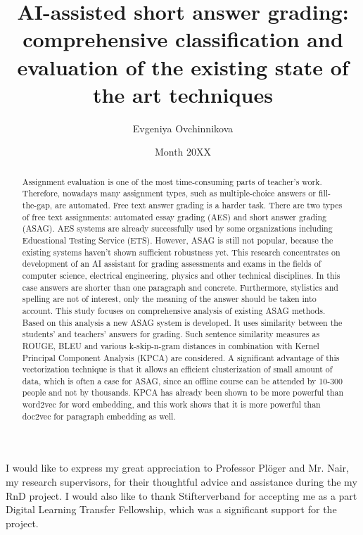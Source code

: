 \documentclass[rnd]{mas_report}
\author{Evgeniya Ovchinnikova}
\title{AI-assisted short answer grading: comprehensive classification and evaluation of the existing state of the art techniques}
\date{Month 20XX}
\begin{document}
\begin{titlepage}
    \maketitle
\end{titlepage}


\pagestyle{plain}


\cleardoublepage
\statementpage

\begin{abstract}
Assignment evaluation is one of the most time-consuming parts of teacher's work. Therefore, nowadays many assignment types, such as multiple-choice answers or fill-the-gap, are automated. Free text answer grading is a harder task. There are two types of free text assignments: automated essay grading (AES) and short answer grading (ASAG). AES systems are already successfully used by some organizations including Educational Testing Service (ETS). However, ASAG is still not popular, because the existing systems haven't shown sufficient robustness yet. This research concentrates on development of an AI assistant for grading assessments and exams in the fields of computer science, electrical engineering, physics and other technical disciplines. In this case answers are shorter than one paragraph and concrete. Furthermore, stylistics and spelling are not of interest, only the meaning of the answer should be taken into account. This study focuses on comprehensive analysis of existing ASAG methods. Based on this analysis a new ASAG system is developed. It uses similarity between the students' and teachers' answers for grading. Such sentence similarity measures as ROUGE, BLEU and various k-skip-n-gram distances in combination with Kernel Principal Component Analysis (KPCA) are considered. A significant advantage of this vectorization technique is that it allows an efficient clusterization of small amount of data, which is often a case for ASAG, since an offline course can be attended by 10-300 people and not by thousands. KPCA has already been shown to be more powerful than word2vec for word embedding, and this work shows that it is more powerful than doc2vec for paragraph embedding as well.
\end{abstract}


\begin{acknowledgements}
I would like to express my great appreciation to Professor Pl{\"o}ger and Mr. Nair, my research supervisors, for their thoughtful advice and assistance during the my RnD project. I would also like to thank Stifterverband for accepting me as a part Digital Learning Transfer Fellowship, which was a significant support for the project. 
\end{acknowledgements}
\end{document}
